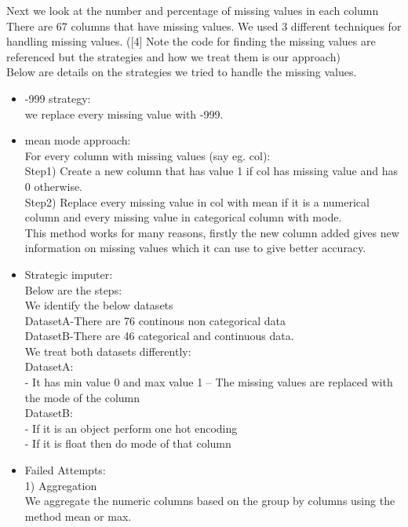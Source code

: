 \documentclass[fleqn,10pt]{SelfArx} %
\begin{document}
\noindent
Next we look at the number and percentage of missing values in each column There are 67 columns that have missing values. We used 3 different techniques for handling missing values. ([4] Note the code for finding the missing values are referenced but the strategies and how we treat them is our approach)\\
Below are details on the strategies we tried to handle the missing values.
\begin{itemize}
	\item -999 strategy:\\
	we replace every missing value with -999. 
	\item mean mode approach:\\
	For every column with missing values (say eg. col):\\
	Step1) Create a new column that has value 1 if col has missing value and has 0 otherwise.\\
	Step2) Replace every missing value in col with mean if it is a numerical column and every missing value in categorical column with mode.\\
	
	This method works for many reasons, firstly the new column added gives new information on missing values which it can use to give better accuracy.\\
	
	\item Strategic imputer:\\                                                                               
	Below are the steps:\\
	We identify the below datasets\\
	DatasetA-There are 76 continous non categorical data\\
	DatasetB-There are 46 categorical and continuous data.\\
	
	We treat both datasets differently:\\
	DatasetA:\\
	-	It has min value 0 and max value 1 – The missing values are replaced with the mode of the column\\
	DatasetB:\\
	-	If it is an object perform one hot encoding\\
	-	If it is float then do mode of that column\\
	
	\item Failed Attempts:\\
	1)  Aggregation \\
	We aggregate the numeric columns based on the group by columns using the method mean or max.\\
	

\end{itemize}
\end{document}
